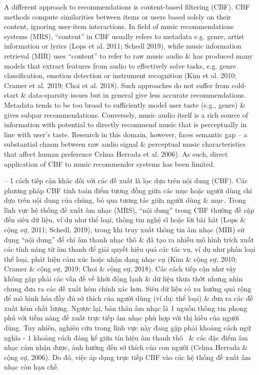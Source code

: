 \documentclass{article}
\begin{document}
\begin{itemize}
    A different approach to recommendations is content-based filtering (CBF). CBF methods compute similarities between items or users based solely on their content, ignoring user-item interactions. In field of music recommendations systems (MRS), ``content'' in CBF usually refers to metadata e.g. genre, artist information or lyrics (Lops et al. 2011; Schedl 2019), while music information retrieval (MIR) uses ``content'' to refer to raw music audio \& has produced many models that extract features from audio to effectively solve tasks, e.g. genre classification, emotion detection or instrument recognition (Kim et al. 2010; Cramer et al. 2019; Choi et al. 2018). Such approaches do not suffer from cold-start \& data-sparsity issues but in general give less accurate recommendations. Metadata tends to be too broad to sufficiently model user taste (e.g., genre) \& gives subpar recommendations. Conversely, music audio itself is a rich source of information with potential to directly recommend music that is perceptually in line with user's taste. Research in this domain, however, faces semantic gap -- a substantial chasm between raw audio signal \& perceptual music characteristics that affect human preference Celma Herrada et al. 2006). As such, direct application of CBF to music recommender systems has been limited.

    -- 1 cách tiếp cận khác đối với các đề xuất là lọc dựa trên nội dung (CBF). Các phương pháp CBF tính toán điểm tương đồng giữa các mục hoặc người dùng chỉ dựa trên nội dung của chúng, bỏ qua tương tác giữa người dùng \& mục. Trong lĩnh vực hệ thống đề xuất âm nhạc (MRS), ``nội dung'' trong CBF thường đề cập đến siêu dữ liệu, ví dụ như thể loại, thông tin nghệ sĩ hoặc lời bài hát (Lops \& cộng sự, 2011; Schedl, 2019), trong khi truy xuất thông tin âm nhạc (MIR) sử dụng ``nội dung'' để chỉ âm thanh nhạc thô \& đã tạo ra nhiều mô hình trích xuất các tính năng từ âm thanh để giải quyết hiệu quả các tác vụ, ví dụ như phân loại thể loại, phát hiện cảm xúc hoặc nhận dạng nhạc cụ (Kim \& cộng sự, 2010; Cramer \& cộng sự, 2019; Choi \& cộng sự, 2018). Các cách tiếp cận như vậy không gặp phải các vấn đề về khởi động lạnh \& dữ liệu thưa thớt nhưng nhìn chung đưa ra các đề xuất kém chính xác hơn. Siêu dữ liệu có xu hướng quá rộng để mô hình hóa đầy đủ sở thích của người dùng (ví dụ: thể loại) \& đưa ra các đề xuất kém chất lượng. Ngược lại, bản thân âm nhạc là 1 nguồn thông tin phong phú với tiềm năng đề xuất trực tiếp âm nhạc phù hợp với thị hiếu của người dùng. Tuy nhiên, nghiên cứu trong lĩnh vực này đang gặp phải khoảng cách ngữ nghĩa - 1 khoảng cách đáng kể giữa tín hiệu âm thanh thô \ \& các đặc điểm âm nhạc cảm nhận được, ảnh hưởng đến sở thích của con người (Celma Herrada \& cộng sự, 2006). Do đó, việc áp dụng trực tiếp CBF vào các hệ thống đề xuất âm nhạc còn hạn chế.


\end{itemize}
\end{document}
